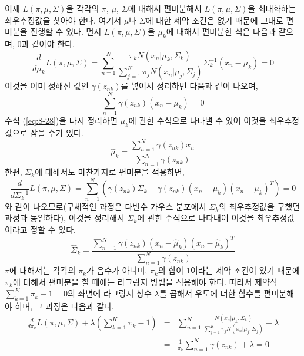 \documentclass[a4paper]{oblivoir}
\begin{document}
이제 $L(\pi, \mu, \Sigma)$을 각각의 $\pi$, ${\mu}$, ${\Sigma}$에 대해서 편미분해서 $L(\pi, \mu, \Sigma)$을 최대화하는 최우추정값을 찾아야 한다. 여기서 $\mu$나 $\Sigma$에 대한 제약 조건은 없기 때문에 그대로 편미분을 진행할 수 있다. 먼저 $L(\pi, \mu, \Sigma)$을 $\mu_{k}$에 대해서 편미분한 식은 다음과 같으며, 0과 같아야 한다. 
\begin{equation}
\frac{d}{d\mu_{k}} L(\pi, \mu, \Sigma) =  \sum_{n=1}^{N} \frac{ \pi_{k} N(x_{n}|{\mu}_{k}, {\Sigma}_{k}) }{ \sum_{j=1}^{K} \pi_{j} N(x_{n}|{\mu}_{j}, {\Sigma}_{j}) } \Sigma_{k}^{-1} (x_n - \mu_{k}) = 0 \label{eq:8-27} 
\end{equation}
이것을 이미 정해진 값인 $\gamma(z_{nk})$를 넣어서 정리하면 다음과 같이 나오며,  
\begin{equation}
\sum_{n=1}^{N} \gamma(z_{nk})(x_{n} - \mu_{k}) = 0 \label{eq:8-28} 
\end{equation}
수식 (\ref{eq:8-28})을 다시 정리하면 ${\mu}_{k}$에 관한 수식으로 나타낼 수 있어 이것을 최우추정값으로 삼을 수가 있다. 
\begin{equation}
\hat{\mu}_{k} = \frac{\sum_{n=1}^{N} \gamma(z_{nk}) x_n}{\sum_{n=1}^{N} \gamma(z_{nk})} \label{eq:8-29} 
\end{equation}
한편, $\Sigma_{k}$에 대해서도 마찬가지로 편미분을 적용하면,  
\begin{equation}
\frac{d}{d\Sigma_{k}^{-1}} L(\pi, \mu, \Sigma) = \sum_{n=1}^{N} (\gamma(z_{nk}) {\Sigma_{k}} - \gamma(z_{nk}) ( {x}_n- {\mu_{k}})  ( {x}_n- {\mu_{k}})^{T}) = 0 \label{eq:8-30} 
\end{equation}
와 같이 나오므로(구체적인 과정은 다변수 가우스 분포에서 $\Sigma_{k}$의 최우추정값을 구했던 과정과 동일하다),  이것을 정리해서 ${\Sigma}_{k}$에 관한 수식으로 나타내어 이것을 최우추정값이라고 정할 수 있다. 
\begin{equation}
\hat{\Sigma}_{k} = \frac{\sum_{n=1}^{N} \gamma(z_{nk}) ( {x}_n-\hat{{\mu}}_{k})  ( {x}_n-\hat{ {\mu}}_{k})^{T} }{\sum_{n=1}^{N} \gamma(z_{nk})}   \label{eq:8-31} 
\end{equation}
$\pi$에 대해서는 각각의 $\pi_k$가 음수가 아니며, $\pi_k$의 합이 1이라는 제약 조건이 있기 때문에 $\pi_k$에 대해서 편미분을 할 때에는 라그랑지 방법을 적용해야 한다. 따라서 제약식 $\sum_{k=1}^{K} \pi_{k} - 1 = 0$의 좌변에 라그랑지 상수 $\lambda$를 곱해서 우도에 더한 함수를 편미분해야 하며, 그 과정은 다음과 같다.
\begin{eqnarray}
\frac{d}{d\pi_{k}} L(\pi, \mu, \Sigma) + \lambda(\sum_{k=1}^{K} \pi_{k} - 1) & = &  \sum_{n=1}^{N} \frac{N(x_{n}|{\mu}_{k}, {\Sigma}_{k}) }{ \sum_{j=1}^{K} \pi_{j} N(x_{n}|{\mu}_{j}, {\Sigma}_{j}) } + \lambda    \nonumber  \\
& = & \frac{1}{{\pi}_{k}} \sum_{n=1}^{N} \gamma(z_{nk}) + \lambda  = 0 \label{eq:8-33} 
\end{eqnarray}
\end{document}
